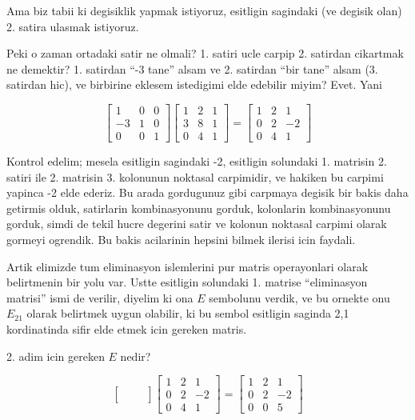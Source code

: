 \documentclass[12pt,fleqn]{article}\usepackage{../common}
\begin{document}
Ama biz tabii ki degisiklik yapmak istiyoruz, esitligin sagindaki (ve
degisik olan) 2. satira ulasmak istiyoruz. 

Peki o zaman ortadaki satir ne olmali? 1. satiri ucle carpip 2. satirdan
cikartmak ne demektir? 1. satirdan ``-3 tane'' alsam ve 2. satirdan ``bir
tane'' alsam (3. satirdan hic), ve birbirine eklesem istedigimi elde
edebilir miyim? Evet. Yani 

$$ 
\left[\begin{array}{rrr}
1 & 0 & 0 \\
-3 & 1 & 0 \\
0 & 0 & 1
\end{array}\right]
\left[\begin{array}{rrr}
1 & 2 & 1 \\
3 & 8 & 1 \\
0 & 4 & 1
\end{array}\right] =
\left[\begin{array}{rrr}
    1 & 2 & 1 \\
    0 & 2 & -2 \\
    0 & 4 & 1
  \end{array}\right]
 $$

Kontrol edelim; mesela esitligin sagindaki -2, esitligin solundaki
1. matrisin 2. satiri ile 2. matrisin 3. kolonunun noktasal carpimidir, ve
hakiken bu carpimi yapinca -2 elde ederiz. Bu arada gordugunuz gibi
carpmaya degisik bir bakis daha getirmis olduk, satirlarin kombinasyonunu
gorduk, kolonlarin kombinasyonunu gorduk, simdi de tekil hucre degerini 
satir ve kolonun noktasal carpimi olarak gormeyi ogrendik. Bu bakis
acilarinin hepsini bilmek ilerisi icin faydali.

Artik elimizde tum eliminasyon islemlerini pur matris operayonlari olarak
belirtmenin bir yolu var. Ustte esitligin solundaki 1. matrise
``eliminasyon matrisi'' ismi de verilir, diyelim ki ona $E$ sembolunu
verdik, ve bu ornekte onu $E_{21}$ olarak belirtmek uygun olabilir, ki bu
sembol esitligin saginda 2,1 kordinatinda sifir elde etmek icin gereken
matris. 

2. adim icin gereken $E$ nedir? 

$$ 
\left[\begin{array}{rrr}
 &  &  \\
 &  &  \\
 &  & 
\end{array}\right]
\left[\begin{array}{rrr}
  1 & 2 & 1 \\
  0 & 2 & -2 \\
  0 & 4 & 1
\end{array}\right] 
=
\left[\begin{array}{rrr}
1 & 2 & 1 \\
0 & 2 & -2 \\
0 & 0 & 5
\end{array}\right]
 $$
\end{document}
